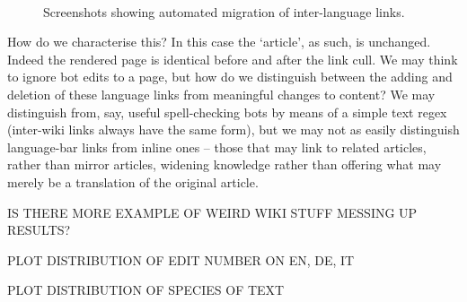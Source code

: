 \begin{figure}
  \label{fig:traj-bot-explanation}
  \centering
  \\
\caption{Screenshots showing automated migration of inter-language links.}
\end{figure}

How do we characterise this? In this case the `article', as such, is
unchanged. Indeed the rendered page is identical before and after the
link cull. We may think to ignore bot edits to a page, but how do we
distinguish between the adding and deletion of these language links
from meaningful changes to content? We may distinguish from, say,
useful spell-checking bots by means of a simple text regex (inter-wiki
links always have the same form), but we may not as easily distinguish
language-bar links from inline ones -- those that may link to related
articles, rather than mirror articles, widening knowledge rather than
offering what may merely be a translation of the original
article.

IS THERE MORE EXAMPLE OF WEIRD WIKI STUFF MESSING UP RESULTS?

PLOT DISTRIBUTION OF EDIT NUMBER ON EN, DE, IT

PLOT DISTRIBUTION OF SPECIES OF TEXT 

